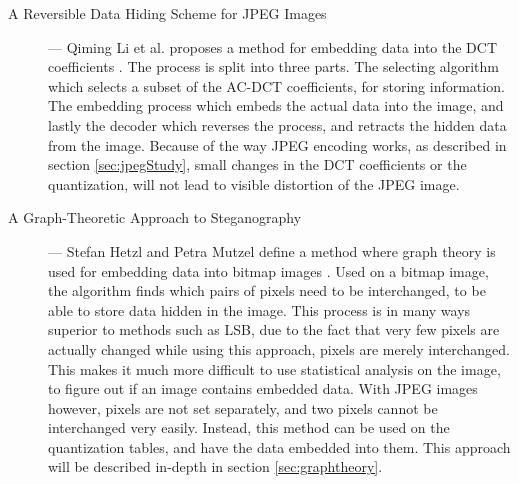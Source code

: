 \begin{description}
	\item[A Reversible Data Hiding Scheme for JPEG Images] ---		
	Qiming Li et al. proposes a method for embedding data into the DCT coefficients \citep{Li2010}.
	The process is split into three parts. The selecting algorithm which selects a subset of the AC-DCT coefficients, for storing information. 
	The embedding process which embeds the actual data into the image, and lastly the decoder which reverses the process, and retracts the hidden data from 	the image. 
	Because of the way JPEG encoding works, as described in section \ref{sec:jpegStudy}, small changes in the DCT coefficients or the quantization, will 		not lead to visible distortion of the JPEG image.
	
	\item[A Graph-Theoretic Approach to Steganography] ---
	Stefan Hetzl and Petra Mutzel define a method where graph theory is used for embedding data into bitmap images \citep{hetzl_2005}. 
	Used on a bitmap image, the algorithm finds which pairs of pixels need to be interchanged, to be able to store data hidden in the image. 
	This process is in many ways superior to methods such as LSB, due to the fact that very few pixels are actually changed while using this approach, 			pixels are 	merely interchanged.
	This makes it much more difficult to use statistical analysis on the image, to figure out if an image contains embedded data. 
	With JPEG images however, pixels are not set separately, and two pixels cannot be interchanged very easily. 
	Instead, this method can be used on the quantization tables, and have the data embedded into them.
	This approach will be described in-depth in section \ref{sec:graphtheory}.
\end{description}